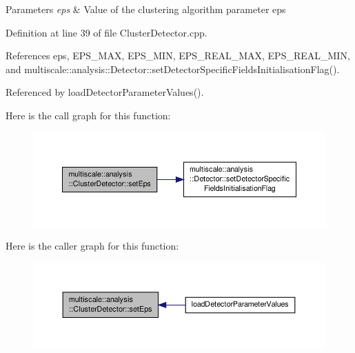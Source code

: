 \begin{DoxyParams}{Parameters}
{\em eps} & Value of the clustering algorithm parameter eps \\
\hline
\end{DoxyParams}


Definition at line 39 of file Cluster\-Detector.\-cpp.



References eps, E\-P\-S\-\_\-\-M\-A\-X, E\-P\-S\-\_\-\-M\-I\-N, E\-P\-S\-\_\-\-R\-E\-A\-L\-\_\-\-M\-A\-X, E\-P\-S\-\_\-\-R\-E\-A\-L\-\_\-\-M\-I\-N, and multiscale\-::analysis\-::\-Detector\-::set\-Detector\-Specific\-Fields\-Initialisation\-Flag().



Referenced by load\-Detector\-Parameter\-Values().



Here is the call graph for this function\-:\nopagebreak
\begin{figure}[H]
\begin{center}
\leavevmode
\includegraphics[width=350pt]{classmultiscale_1_1analysis_1_1ClusterDetector_a35eaa560c893a86c3149471f40c15979_cgraph}
\end{center}
\end{figure}




Here is the caller graph for this function\-:\nopagebreak
\begin{figure}[H]
\begin{center}
\leavevmode
\includegraphics[width=350pt]{classmultiscale_1_1analysis_1_1ClusterDetector_a35eaa560c893a86c3149471f40c15979_icgraph}
\end{center}
\end{figure}


